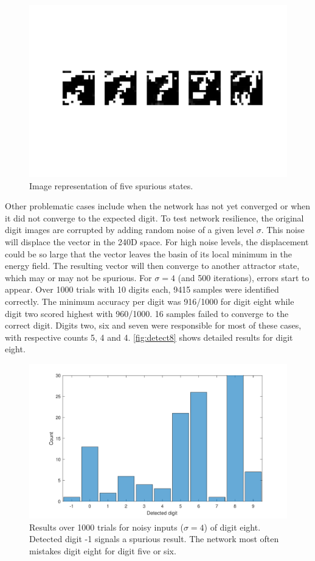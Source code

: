 \documentclass[a4, 10pt, twoside, twocolumn]{article}
\numberwithin{figure}{section}
\begin{document}
\begin{figure}[ht]
    \includegraphics[width=\linewidth, trim=3cm 8cm 3cm 8cm, clip]{img/Spurious.pdf}
    \caption{Image representation of five spurious states.}
    \label{fig:spurious}
\end{figure}

Other problematic cases include when the network has not yet converged or when it did not converge to the expected digit. To test network resilience, the original digit images are corrupted by adding random noise of a given level $\sigma$. This noise will displace the vector in the 240D space. For high noise levels, the displacement could be so large that the vector leaves the basin of its local minimum in the energy field. The resulting vector will then converge to another attractor state, which may or may not be spurious. For $\sigma = 4$ (and 500 iterations), errors start to appear. Over 1000 trials with 10 digits each, 9415 samples were identified correctly. The minimum accuracy per digit was 916/1000 for digit eight while digit two scored highest with 960/1000. 16 samples failed to converge to the correct digit. Digits two, six and seven were responsible for most of these cases, with respective counts 5, 4 and 4. \autoref{fig:detect8} shows detailed results for digit eight.

\begin{figure}[ht]
    \includegraphics[width=\linewidth]{img/Detect8.pdf}
    \caption{Results over 1000 trials for noisy inputs ($\sigma = 4$) of digit eight. Detected digit -1 signals a spurious result. The network most often mistakes digit eight for digit five or six.}
    \label{fig:detect8}
\end{figure}
\end{document}
